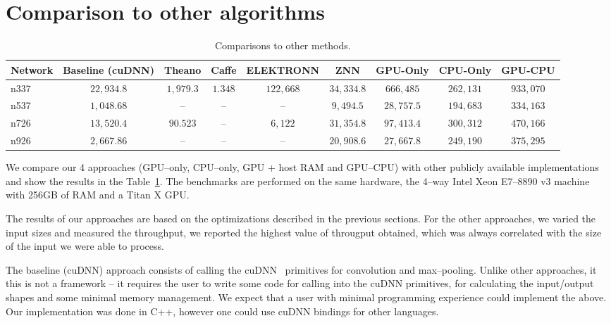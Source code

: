 \documentclass[conference]{./IEEEtran/IEEEtran}
\begin{document}
\section{Comparison to other algorithms}


  \begin{table}[h!tbp]
    \centering
    \begin{tabular}{l|cccccccc}
      \toprule
      Network  & Baseline (cuDNN)  & Theano      & Caffe    & ELEKTRONN   & ZNN         & GPU-Only    & CPU-Only    & GPU-CPU   \\
      \midrule
      n337     & $22,934.8$        & $1,979.3$   & $1.348$  & $122,668$   & $34,334.8$  & $666,485$   & $262,131$   & $933,070$ \\
      n537     & $1,048.68$        & --          & --       & --          & $9,494.5$   & $28,757.5$  & $194,683$   & $334,163$ \\
      n726     & $13,520.4$        & $90.523$    & --       & $6,122$     & $31,354.8$  & $97,413.4$  & $300,312$   & $470,166$ \\
      n926     & $2,667.86$        & --          & --       & --          & $20,908.6$  & $27,667.8$  & $249,190$   & $375,295$ \\
      \bottomrule
    \end{tabular}
    \caption{Comparisons to other methods.}
    \label{table:comparisons_to_others}
  \end{table}

  We compare our 4 approaches (GPU--only, CPU--only, GPU + host RAM
  and GPU--CPU) with other publicly available implementations and show
  the results in the Table~\ref{table:comparisons_to_others}.  The
  benchmarks are performed on the same hardware, the 4--way Intel Xeon
  E7–8890 v3 machine with 256GB of RAM and a Titan X GPU.

  The results of our approaches are based on the optimizations
  described in the previous sections.  For the other approaches, we
  varied the input sizes and measured the throughput, we reported the
  highest value of througput obtained, which was always correlated
  with the size of the input we were able to process.

  The baseline (cuDNN) approach consists of calling the
  cuDNN~\cite{chetlur2014cudnn} primitives for convolution and
  max--pooling.  Unlike other approaches, it this is not a framework
  -- it requires the user to write some code for calling into the
  cuDNN primitives, for calculating the input/output shapes and some
  minimal memory management.  We expect that a user with minimal
  programming experience could implement the above.  Our
  implementation was done in C++, however one could use cuDNN bindings
  for other languages.
\end{document}
